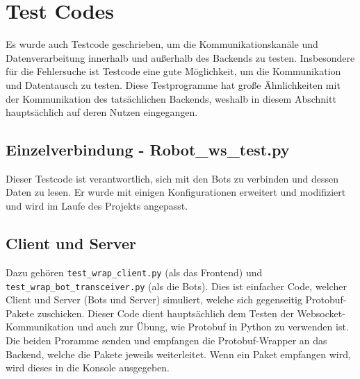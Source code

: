 \section{Test Codes}
Es wurde auch Testcode geschrieben, 
um die Kommunikationskanäle und Datenverarbeitung innerhalb 
und außerhalb des Backends zu testen.
% 
Insbesondere für die Fehlersuche ist Testcode eine gute Möglichkeit, 
um die Kommunikation und Datentausch zu testen.
%
Diese Testprogramme hat große Ähnlichkeiten mit der Kommunikation des tatsächlichen Backends, 
weshalb in diesem Abschnitt hauptsächlich auf deren Nutzen eingegangen.

\subsection{Einzelverbindung - Robot\_ws\_test.py}
Dieser Testcode ist verantwortlich, sich mit den Bots zu verbinden 
und dessen Daten zu lesen.
%
Er wurde mit einigen Konfigurationen erweitert und modifiziert 
und wird im Laufe des Projekts angepasst.

\subsection{Client und Server}
Dazu gehören \texttt{test\_wrap\_client.py} (als das Frontend) 
und \texttt{test\_wrap\_bot\_transceiver.py} (als die Bots).
%
Dies ist einfacher Code, welcher Client und Server (Bots und Server) simuliert, 
welche sich gegenseitig Protobuf-Pakete zuschicken. 
%
Dieser Code dient hauptsächlich dem Testen der Websocket-Kommunikation 
und auch zur Übung, wie Protobuf in Python zu verwenden ist.
% 
Die beiden Proramme senden und empfangen die Protobuf-Wrapper an das Backend,
welche die Pakete jeweils weiterleitet.
% 
Wenn ein Paket empfangen wird, wird dieses in die Konsole ausgegeben.
